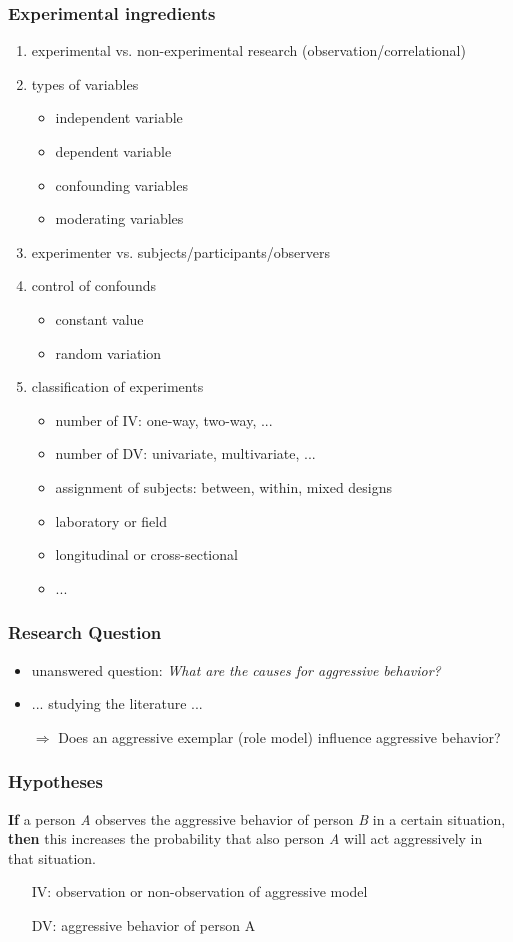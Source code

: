\documentclass[]{beamer}
\begin{document}
\begin{frame}
 \frametitle{Experimental ingredients}
\begin{enumerate}[<+->]
 \item experimental vs. non-experimental research (observation/correlational)
 \item types of variables
 \begin{itemize}
  \item independent variable
  \item dependent variable
  \item confounding variables
  \item moderating variables
 \end{itemize}
 \item experimenter vs. subjects/participants/observers
 \item control of confounds
  \begin{itemize}
   \item constant value
   \item random variation
  \end{itemize}
 \item classification of experiments
  \begin{itemize}
   \item number of IV: one-way, two-way, ...
   \item number of DV: univariate, multivariate, ...
   \item assignment of subjects: between, within, mixed designs 
   \item laboratory or field 
   \item longitudinal or cross-sectional
   \item ... 
  \end{itemize}
\end{enumerate}
\end{frame}


\begin{frame}
\frametitle{Research Question}
\begin{itemize}
 \item unanswered question: \textit{What are the causes for aggressive
behavior?}
 \item ... studying the literature ...
 \item[$\Rightarrow$] Does an aggressive exemplar (role model) influence
aggressive behavior? 
\end{itemize}
\end{frame}

\begin{frame}
\frametitle{Hypotheses}
\textbf{If} a person \textit{A} observes the aggressive behavior
of person \textit{B} in a certain situation, \textbf{then} this increases the
probability that also person \textit{A} will act aggressively in that
situation.
\begin{itemize}
 \item[IV:] observation or non-observation of aggressive model
 \item[DV:] aggressive behavior of person A
\end{itemize}
\end{frame}
\end{document}
